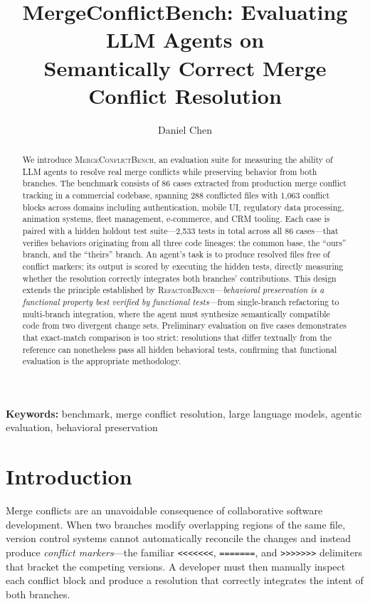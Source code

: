 \documentclass[11pt,a4paper]{article}
\title{\textbf{MergeConflictBench: Evaluating LLM Agents on\\Semantically Correct Merge Conflict Resolution}}
\author[1]{Daniel Chen}
\affil[1]{Anything, Inc.}
\date{}
\begin{document}
\maketitle

\begin{abstract}
We introduce \textsc{MergeConflictBench}, an evaluation suite for measuring the ability of LLM agents to resolve real merge conflicts while preserving behavior from both branches. The benchmark consists of 86 cases extracted from production merge conflict tracking in a commercial codebase, spanning 288 conflicted files with 1{,}063 conflict blocks across domains including authentication, mobile UI, regulatory data processing, animation systems, fleet management, e-commerce, and CRM tooling. Each case is paired with a hidden holdout test suite---2{,}533 tests in total across all 86 cases---that verifies behaviors originating from all three code lineages: the common base, the ``ours'' branch, and the ``theirs'' branch. An agent's task is to produce resolved files free of conflict markers; its output is scored by executing the hidden tests, directly measuring whether the resolution correctly integrates both branches' contributions. This design extends the principle established by \textsc{RefactorBench}---\emph{behavioral preservation is a functional property best verified by functional tests}---from single-branch refactoring to multi-branch integration, where the agent must synthesize semantically compatible code from two divergent change sets. Preliminary evaluation on five cases demonstrates that exact-match comparison is too strict: resolutions that differ textually from the reference can nonetheless pass all hidden behavioral tests, confirming that functional evaluation is the appropriate methodology.
\end{abstract}

\medskip
\noindent\textbf{Keywords:} benchmark, merge conflict resolution, large language models, agentic evaluation, behavioral preservation

\section{Introduction}
\label{sec:introduction}

Merge conflicts are an unavoidable consequence of collaborative software development. When two branches modify overlapping regions of the same file, version control systems cannot automatically reconcile the changes and instead produce \emph{conflict markers}---the familiar \texttt{<{}<{}<{}<{}<{}<{}<}, \texttt{=======}, and \texttt{>{}>{}>{}>{}>{}>{}>{}} delimiters that bracket the competing versions. A developer must then manually inspect each conflict block and produce a resolution that correctly integrates the intent of both branches.
\end{document}

